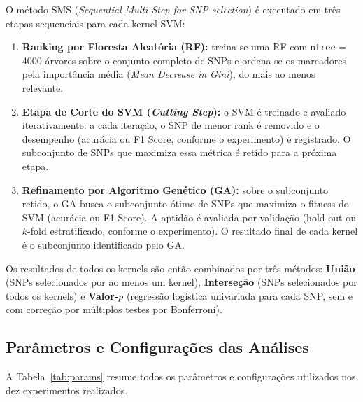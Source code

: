 \documentclass[12pt,a4paper]{article}
\newcommand{\novo}[1]{\textcolor{corNova}{#1}}
\begin{document}
\novo{O método SMS (\textit{Sequential Multi-Step for SNP selection}) é executado em três etapas sequenciais para cada kernel SVM:}
\begin{enumerate}
  \item \novo{\textbf{Ranking por Floresta Aleatória (RF):} treina-se uma RF com \texttt{ntree} = 4000 árvores sobre o conjunto completo de SNPs e ordena-se os marcadores pela importância média (\textit{Mean Decrease in Gini}), do mais ao menos relevante.}
  \item \novo{\textbf{Etapa de Corte do SVM (\textit{Cutting Step}):} o SVM é treinado e avaliado iterativamente: a cada iteração, o SNP de menor rank é removido e o desempenho (acurácia ou F1 Score, conforme o experimento) é registrado. O subconjunto de SNPs que maximiza essa métrica é retido para a próxima etapa.}
  \item \novo{\textbf{Refinamento por Algoritmo Genético (GA):} sobre o subconjunto retido, o GA busca o subconjunto ótimo de SNPs que maximiza o fitness do SVM (acurácia ou F1 Score). A aptidão é avaliada por validação (hold-out ou $k$-fold estratificado, conforme o experimento). O resultado final de cada kernel é o subconjunto identificado pelo GA.}
\end{enumerate}

\novo{Os resultados de todos os kernels são então combinados por três métodos: \textbf{União} (SNPs selecionados por ao menos um kernel), \textbf{Interseção} (SNPs selecionados por todos os kernels) e \textbf{Valor-$p$} (regressão logística univariada para cada SNP, sem e com correção por múltiplos testes por Bonferroni).}

\subsection*{\novo{Parâmetros e Configurações das Análises}}

\novo{A Tabela~\ref{tab:params} resume todos os parâmetros e configurações utilizados nos dez experimentos realizados.}
\end{document}
